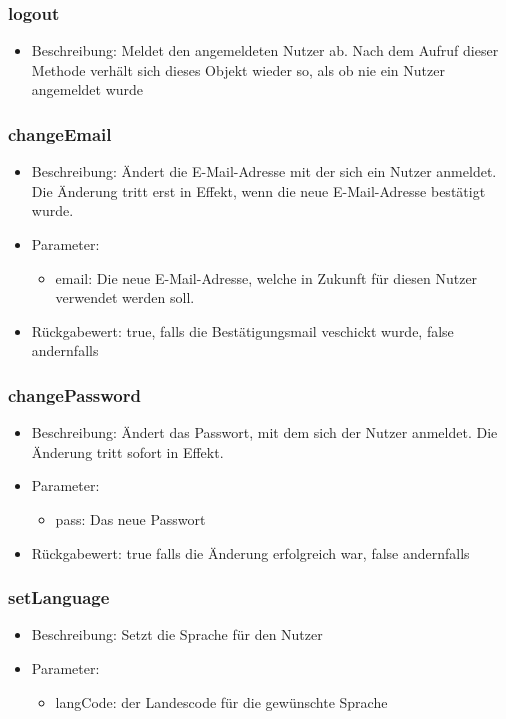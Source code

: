 \documentclass[a4paper]{scrreprt}
\begin{document}
		\subsubsection{logout}
		\begin{itemize}
			\item Beschreibung: Meldet den angemeldeten Nutzer ab. Nach dem Aufruf dieser Methode verhält sich dieses Objekt wieder so, als ob nie ein Nutzer angemeldet wurde
		\end{itemize}
		\subsubsection{changeEmail}
			\begin{itemize}
				\item Beschreibung: Ändert die E-Mail-Adresse mit der sich ein Nutzer anmeldet. Die Änderung tritt erst in Effekt, wenn die neue E-Mail-Adresse bestätigt wurde.
				\item Parameter:
				\begin{itemize}
					\item email: Die neue E-Mail-Adresse, welche in Zukunft für diesen Nutzer verwendet werden soll.
				\end{itemize}
				\item Rückgabewert: true, falls die Bestätigungsmail veschickt wurde, false andernfalls
			\end{itemize}
			\subsubsection{changePassword}
			\begin{itemize}
				\item Beschreibung: Ändert das Passwort, mit dem sich der Nutzer anmeldet. Die Änderung tritt sofort in Effekt.
				\item Parameter:
				\begin{itemize}
					\item pass: Das neue Passwort
				\end{itemize}
				\item Rückgabewert: true falls die Änderung erfolgreich war, false andernfalls
			\end{itemize}
		\subsubsection{setLanguage}
			\begin{itemize}
				\item Beschreibung: Setzt die Sprache für den Nutzer
				\item Parameter:
				\begin{itemize}
					\item langCode: der Landescode für die gewünschte Sprache
				\end{itemize}
			\end{itemize}
\end{document}
